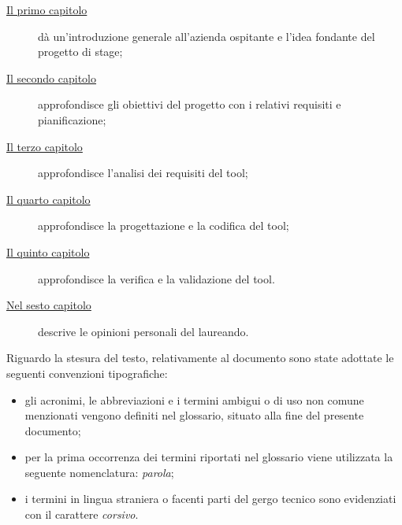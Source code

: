 \begin{description}
    \item[{\hyperref[ch:introduzione]{Il primo capitolo}}] dà un'introduzione generale all'azienda ospitante e l'idea fondante del progetto di stage;

    \item[{\hyperref[ch:descrizione-stage]{Il secondo capitolo}}] approfondisce gli obiettivi del progetto con i relativi requisiti e pianificazione;

    \item[{\hyperref[ch:analisi-requisiti]{Il terzo capitolo}}] approfondisce l'analisi dei requisiti del tool;

    \item[{\hyperref[ch:progettazione-e-codifica]{Il quarto capitolo}}] approfondisce la progettazione e la codifica del tool;
    
    \item[{\hyperref[ch:verifica-validazione]{Il quinto capitolo}}] approfondisce la verifica e la validazione del tool.
    
    \item[{\hyperref[ch:conclusioni]{Nel sesto capitolo}}] descrive le opinioni personali del laureando.
\end{description}

Riguardo la stesura del testo, relativamente al documento sono state adottate le seguenti convenzioni tipografiche:
\begin{itemize}
	\item gli acronimi, le abbreviazioni e i termini ambigui o di uso non comune menzionati vengono definiti nel glossario, situato alla fine del presente documento;
	\item per la prima occorrenza dei termini riportati nel glossario viene utilizzata la seguente nomenclatura: \emph{parola}\glsfirstoccur;
	\item i termini in lingua straniera o facenti parti del gergo tecnico sono evidenziati con il carattere \emph{corsivo}.
\end{itemize}